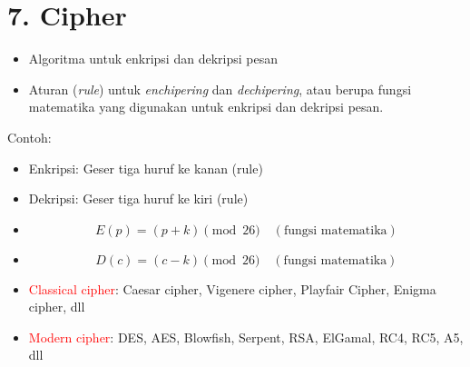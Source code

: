 \documentclass{article}
\begin{document}

\section*{7. Cipher}

\begin{itemize}
    \item Algoritma untuk enkripsi dan dekripsi pesan
    \item Aturan (\textit{rule}) untuk \textit{enchipering} dan \textit{dechipering}, atau berupa fungsi matematika yang digunakan untuk enkripsi dan dekripsi pesan.
\end{itemize}

Contoh:
\begin{itemize}
    \item Enkripsi: Geser tiga huruf ke kanan \quad (rule)
    \item Dekripsi: Geser tiga huruf ke kiri \quad (rule)
    \item \[ E(p) = (p + k) \pmod{26} \quad(\text{fungsi matematika}) \]
    \item \[ D(c) = (c - k) \pmod{26} \quad(\text{fungsi matematika}) \]
\end{itemize}

\begin{itemize}
    \item \textcolor{red}{Classical cipher}: Caesar cipher, Vigenere cipher, Playfair Cipher, Enigma cipher, dll
    \item \textcolor{red}{Modern cipher}: DES, AES, Blowfish, Serpent, RSA, ElGamal, RC4, RC5, A5, dll
\end{itemize}
\end{document}
